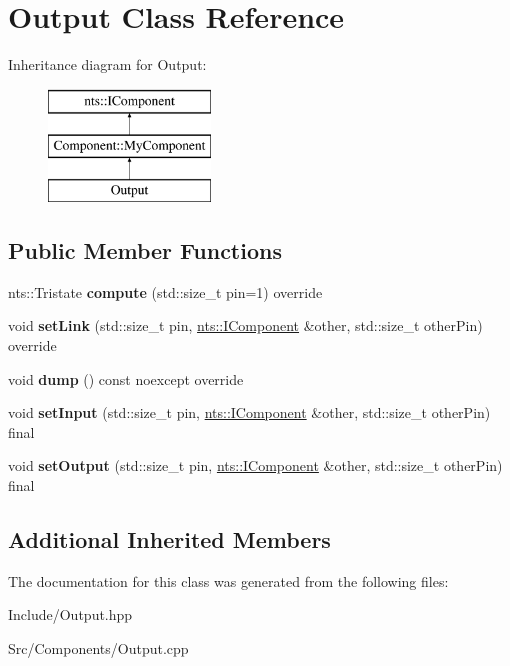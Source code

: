 \hypertarget{classOutput}{}\section{Output Class Reference}
\label{classOutput}
Inheritance diagram for Output\+:\begin{figure}[H]
\begin{center}
\leavevmode
\includegraphics[height=3.000000cm]{classOutput}
\end{center}
\end{figure}
\subsection*{Public Member Functions}
\begin{DoxyCompactItemize}
\item 
\mbox{\label{classOutput_a52cad797fc38f633476965aa7907fd21}} 
nts\+::\+Tristate {\bfseries compute} (std\+::size\+\_\+t pin=1) override
\item 
\mbox{\label{classOutput_a3b109a0a1422e178af7e4571aecf347e}} 
void {\bfseries set\+Link} (std\+::size\+\_\+t pin, \mbox{\hyperlink{classnts_1_1IComponent}{nts\+::\+I\+Component}} \&other, std\+::size\+\_\+t other\+Pin) override
\item 
\mbox{\label{classOutput_a4518c94c7c9e75704e5ea6b8a561588e}} 
void {\bfseries dump} () const noexcept override
\item 
\mbox{\label{classOutput_ae981486010e5fe39b5a1bb369968827d}} 
void {\bfseries set\+Input} (std\+::size\+\_\+t pin, \mbox{\hyperlink{classnts_1_1IComponent}{nts\+::\+I\+Component}} \&other, std\+::size\+\_\+t other\+Pin) final
\item 
\mbox{\label{classOutput_a91d2273bcd7a7989d76e0f07960655c4}} 
void {\bfseries set\+Output} (std\+::size\+\_\+t pin, \mbox{\hyperlink{classnts_1_1IComponent}{nts\+::\+I\+Component}} \&other, std\+::size\+\_\+t other\+Pin) final
\end{DoxyCompactItemize}
\subsection*{Additional Inherited Members}


The documentation for this class was generated from the following files\+:\begin{DoxyCompactItemize}
\item 
Include/Output.\+hpp\item 
Src/\+Components/Output.\+cpp\end{DoxyCompactItemize}
